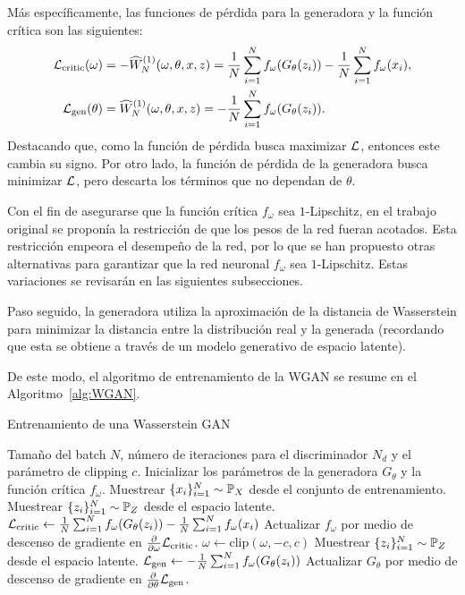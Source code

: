 Más específicamente, las funciones de pérdida para la generadora y la función crítica son las siguientes:
\begin{align}
    \mathcal{L}_{\mathrm{critic}}(\omega)
     & = -\widehat W_N^{(1)} (
    \omega, \theta, x, z
    )
    = \frac{1}{N}\sum_{i=1}^{N} f_\omega(G_\theta(z_i)) - \frac{1}{N}\sum_{i=1}^{N} f_\omega(x_i),
    \\ \mathcal{L}_{\mathrm{gen}}(\theta)
     & = \widehat W_N^{(1)} (
    \omega, \theta, x, z
    )
    = -\frac{1}{N}\sum_{i=1}^{N} f_\omega(G_\theta(z_i)).
\end{align}
Destacando que, como la función de pérdida busca maximizar $\mathcal{L}$, entonces este cambia su signo. Por otro lado, la función de pérdida de la generadora busca minimizar $\mathcal{L}$, pero descarta los términos que no dependan de $\theta$.

Con el fin de asegurarse que la función crítica $f_\omega$ sea $1$-Lipschitz, en el trabajo original se proponía la restricción de que los pesos de la red fueran acotados. Esta restricción empeora el desempeño de la red, por lo que se han propuesto otras alternativas para garantizar que la red neuronal $f_\omega$ sea $1$-Lipschitz. Estas variaciones se revisarán en las siguientes subsecciones.

Paso seguido, la generadora utiliza la aproximación de la distancia de Wasserstein para minimizar la distancia entre la distribución real y la generada (recordando que esta se obtiene a través de un modelo generativo de espacio latente).

De este modo, el algoritmo de entrenamiento de la WGAN se resume en el Algoritmo~\ref{alg:WGAN}.

\begin{algorithm}[H]
    \caption{Entrenamiento de una Wasserstein GAN \cite{arjovsky2017wasserstein}}\label{alg:WGAN}
    \begin{algorithmic}[1]
        \Require Tamaño del batch $N$, número de iteraciones para el discriminador $N_d$ y el parámetro de clipping $c$.
        \State Inicializar los parámetros de la generadora $G_\theta$ y la función crítica $f_\omega$.
        \State Muestrear $\{x_i\}_{i=1}^{N} \sim \Prob_X$ desde el conjunto de entrenamiento.
        \State Muestrear $\{z_i\}_{i=1}^{N} \sim \Prob_Z$ desde el espacio latente.
        \State $\mathcal{L}_{\mathrm{critic}} \gets
            \frac{1}{N} \sum_{i=1}^{N} f_{\omega}(G_\theta(z_i)) - \frac{1}{N} \sum_{i=1}^{N} f_{\omega}(x_i)$ 
        \State Actualizar $f_{\omega}$ por medio de descenso de gradiente en $\pdv{\omega} \mathcal{L}_{\mathrm{critic}}$.
        \State $\omega \gets \text{clip}(\omega, -c, c)$
        \EndFor
        \State Muestrear $\{z_i\}_{i=1}^{N} \sim \Prob_Z$ desde el espacio latente.
        \State $\mathcal{L}_{\mathrm{gen}} \gets - \frac{1}{N}\sum_{i=1}^{N} f_\omega(G_\theta(z_i))$ 
        \State Actualizar $G_\theta$ por medio de descenso de gradiente en $\pdv{\theta} \mathcal{L}_{\mathrm{gen}}$.
        \EndWhile
    \end{algorithmic}
\end{algorithm}


